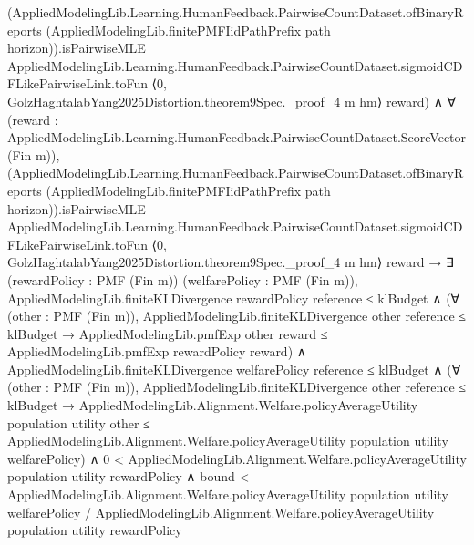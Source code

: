 \documentclass[10pt]{article}
\begin{document}
\begin{ReviewVerbatim}
                      (AppliedModelingLib.Learning.HumanFeedback.PairwiseCountDataset.ofBinaryReports
                            (AppliedModelingLib.finitePMFIidPathPrefix path horizon)).isPairwiseMLE
                        AppliedModelingLib.Learning.HumanFeedback.PairwiseCountDataset.sigmoidCDFLikePairwiseLink.toFun
                        ⟨0, GolzHaghtalabYang2025Distortion.theorem9Spec._proof_4 m hm⟩ reward) ∧
                    ∀ (reward : AppliedModelingLib.Learning.HumanFeedback.PairwiseCountDataset.ScoreVector (Fin m)),
                      (AppliedModelingLib.Learning.HumanFeedback.PairwiseCountDataset.ofBinaryReports
                              (AppliedModelingLib.finitePMFIidPathPrefix path horizon)).isPairwiseMLE
                          AppliedModelingLib.Learning.HumanFeedback.PairwiseCountDataset.sigmoidCDFLikePairwiseLink.toFun
                          ⟨0, GolzHaghtalabYang2025Distortion.theorem9Spec._proof_4 m hm⟩ reward →
                        ∃ (rewardPolicy : PMF (Fin m)) (welfarePolicy : PMF (Fin m)),
                          AppliedModelingLib.finiteKLDivergence rewardPolicy reference ≤ klBudget ∧
                            (∀ (other : PMF (Fin m)),
                                AppliedModelingLib.finiteKLDivergence other reference ≤ klBudget →
                                  AppliedModelingLib.pmfExp other reward ≤
                                    AppliedModelingLib.pmfExp rewardPolicy reward) ∧
                              AppliedModelingLib.finiteKLDivergence welfarePolicy reference ≤ klBudget ∧
                                (∀ (other : PMF (Fin m)),
                                    AppliedModelingLib.finiteKLDivergence other reference ≤ klBudget →
                                      AppliedModelingLib.Alignment.Welfare.policyAverageUtility population utility
                                          other ≤
                                        AppliedModelingLib.Alignment.Welfare.policyAverageUtility population utility
                                          welfarePolicy) ∧
                                  0 <
                                      AppliedModelingLib.Alignment.Welfare.policyAverageUtility population utility
                                        rewardPolicy ∧
                                    bound <
                                      AppliedModelingLib.Alignment.Welfare.policyAverageUtility population utility
                                          welfarePolicy /
                                        AppliedModelingLib.Alignment.Welfare.policyAverageUtility population utility
                                          rewardPolicy
\end{ReviewVerbatim}
\end{document}
